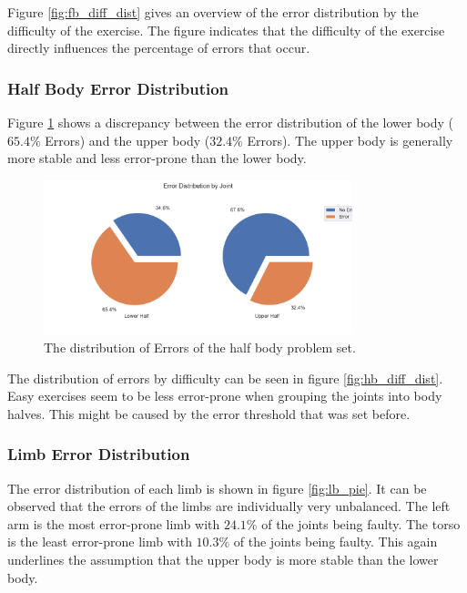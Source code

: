 Figure \ref{fig:fb_diff_dist} gives an overview of the error distribution by the difficulty of the exercise. The figure indicates that the difficulty of the exercise directly influences the percentage of errors that occur.

\subsubsection{Half Body Error Distribution}

Figure \ref{fig:hb_pie} shows a discrepancy between the error distribution of the lower body ($65.4\%$ Errors) and the upper body ($32.4\%$ Errors). The upper body is generally more stable and less error-prone than the lower body.

\begin{figure}[ht]
  \centering
  \includegraphics[width=0.8\textwidth]{figures/Data/dist_half_body/Error_Distribution_by_Joint.png}
  \caption[Error Distribution by Body Half]{The distribution of Errors of the half body problem set.}
  \label{fig:hb_pie}
\end{figure}

The distribution of errors by difficulty can be seen in figure \ref{fig:hb_diff_dist}. Easy exercises seem to be less error-prone when grouping the joints into body halves. This might be caused by the error threshold that was set before.

\subsubsection{Limb Error Distribution}

The error distribution of each limb is shown in figure \ref{fig:lb_pie}. It can be observed that the errors of the limbs are individually very unbalanced. The left arm is the most error-prone limb with $24.1\%$ of the joints being faulty. The torso is the least error-prone limb with $10.3\%$ of the joints being faulty. This again underlines the assumption that the upper body is more stable than the lower body.

